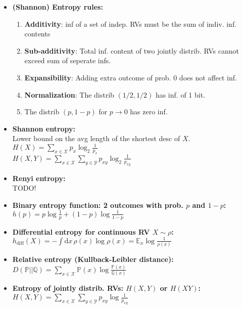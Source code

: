 \documentclass[twocolumn,9pt]{extarticle}
\begin{document}
\begin{itemize}
	\item \textbf{(Shannon) Entropy rules:}
		\begin{enumerate}
			\item \textbf{Additivity}: inf of a set of indep. RVs must be the sum of indiv. inf. contents 
			\item \textbf{Sub-additivity}: Total inf. content of two jointly distrib. RVs cannot exceed sum of seperate infs.
			\item \textbf{Expansibility}: Adding extra outcome of prob. 0 does not affect inf.
			\item \textbf{Normalization}: The distrib $(1/2,1/2)$ has inf. of 1 bit.
			\item The distrib $(p, 1-p)$ for $p \to 0$ has zero inf.
		\end{enumerate}

	\item \textbf{Shannon entropy:} \\
	Lower bound on the avg length of the shortest desc of $X$.\\
	$H(X) = \sum_{x \in \mathcal{X}} p_x \log_2 \frac{1}{p_x}$\\
	$H(X,Y) = \sum_{x \in \mathcal{X}} \sum_{y \in \mathcal{Y}} p_{xy} \log_2 \frac{1}{p_{xy}}$

	\item \textbf{Renyi entropy:} \\
	TODO!

	\item \textbf{Binary entropy function: 2 outcomes with prob. $p$ and $1-p$: } \\
	$h(p) = p \log \frac{1}{p} + (1 - p) \log \frac{1}{1-p}$

	\item \textbf{Differential entropy for continuous RV $X \sim \rho$:} \\
	$h_{\text{diff}}(X) = - \int \mathrm{d}x\, \rho(x) \log \rho(x) = \mathbb{E}_x \log \frac{1}{\rho(x)}$

	\item \textbf{Relative entropy (Kullback-Leibler distance): } \\
	$D(\mathbb{P}||\mathbb{Q}) = \sum_{x \in \mathcal{X}} \mathbb{P}(x) \log \frac{\mathbb{P}(x)}{\mathbb{Q}(x)}$

	\item \textbf{Entropy of jointly distrib. RVs: $H(X,Y)$ or $H(XY)$: } \\
	$H(X,Y) = \sum_{x \in \mathcal{X}} \sum_{y \in \mathcal{Y}} p_{xy} \log \frac{1}{p_{xy}}$


\end{itemize}
\end{document}
